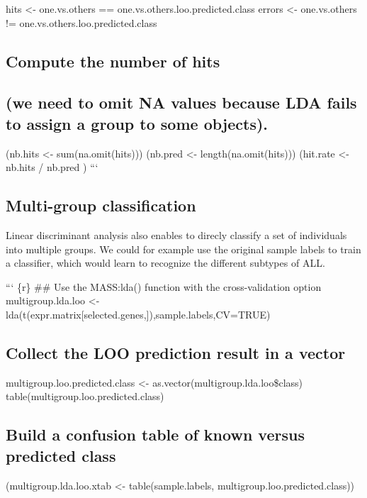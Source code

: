 hits \textless{}- one.vs.others == one.vs.others.loo.predicted.class
errors \textless{}- one.vs.others != one.vs.others.loo.predicted.class

\subsection{Compute the number of
hits}\label{compute-the-number-of-hits}

\subsection{(we need to omit NA values because LDA fails to assign a
group to some
objects).}\label{we-need-to-omit-na-values-because-lda-fails-to-assign-a-group-to-some-objects.}

(nb.hits \textless{}- sum(na.omit(hits))) (nb.pred \textless{}-
length(na.omit(hits))) (hit.rate \textless{}- nb.hits / nb.pred ) ```

\subsection{Multi-group
classification}\label{multi-group-classification}

Linear discriminant analysis also enables to direcly classify a set of
individuals into multiple groups. We could for example use the original
sample labels to train a classifier, which would learn to recognize the
different subtypes of ALL.

``` \{r\} \#\# Use the MASS:lda() function with the cross-validation
option multigroup.lda.loo \textless{}-
lda(t(expr.matrix{[}selected.genes,{]}),sample.labels,CV=TRUE)

\subsection{Collect the LOO prediction result in a
vector}\label{collect-the-loo-prediction-result-in-a-vector-1}

multigroup.loo.predicted.class \textless{}-
as.vector(multigroup.lda.loo\$class)
table(multigroup.loo.predicted.class)

\subsection{Build a confusion table of known versus predicted
class}\label{build-a-confusion-table-of-known-versus-predicted-class-1}

(multigroup.lda.loo.xtab \textless{}- table(sample.labels,
multigroup.loo.predicted.class))

